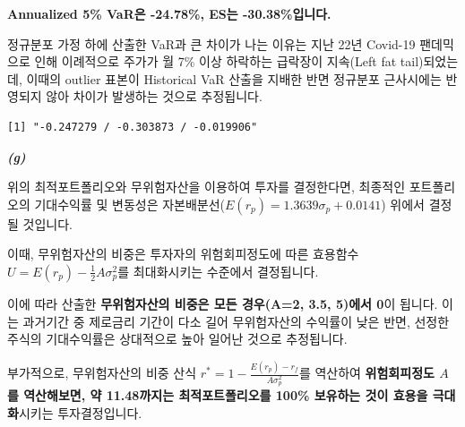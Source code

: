 \documentclass[
  letterpaper,
  DIV=11,
  numbers=noendperiod]{scrreprt}
\newenvironment{Shaded}{\begin{snugshade}}{\end{snugshade}}
\newcommand{\AttributeTok}[1]{\textcolor[rgb]{0.40,0.45,0.13}{#1}}
\newcommand{\DecValTok}[1]{\textcolor[rgb]{0.68,0.00,0.00}{#1}}
\newcommand{\FunctionTok}[1]{\textcolor[rgb]{0.28,0.35,0.67}{#1}}
\newcommand{\NormalTok}[1]{\textcolor[rgb]{0.00,0.23,0.31}{#1}}
\newcommand{\OtherTok}[1]{\textcolor[rgb]{0.00,0.23,0.31}{#1}}
\newcommand{\SpecialCharTok}[1]{\textcolor[rgb]{0.37,0.37,0.37}{#1}}
\newcommand{\StringTok}[1]{\textcolor[rgb]{0.13,0.47,0.30}{#1}}
\begin{document}
\textbf{Annualized 5\% VaR은 -24.78\%, ES는 -30.38\%입니다.}

정규분포 가정 하에 산출한 VaR과 큰 차이가 나는 이유는 지난 22년 Covid-19
팬데믹으로 인해 이례적으로 주가가 월 7\% 이상 하락하는 급락장이
지속(Left fat tail)되었는데, 이때의 outlier 표본이 Historical VaR 산출을
지배한 반면 정규분포 근사시에는 반영되지 않아 차이가 발생하는 것으로
추정됩니다.

\begin{Shaded}
\end{Shaded}

\begin{verbatim}
[1] "-0.247279 / -0.303873 / -0.019906"
\end{verbatim}

\textbf{\emph{(g)}}

위의 최적포트폴리오와 무위험자산을 이용하여 투자를 결정한다면, 최종적인
포트폴리오의 기대수익률 및 변동성은
자본배분선(\(E(r_p)=1.3639\sigma_p+0.0141\)) 위에서 결정될 것입니다.

이때, 무위험자산의 비중은 투자자의 위험회피정도에 따른 효용함수
\(U=E(r_p)-\frac{1}{2}A\sigma_p^2\)를 최대화시키는 수준에서 결정됩니다.

이에 따라 산출한 \textbf{무위험자산의 비중은 모든 경우(A=2, 3.5, 5)에서
0}이 됩니다. 이는 과거기간 중 제로금리 기간이 다소 길어 무위험자산의
수익률이 낮은 반면, 선정한 주식의 기대수익률은 상대적으로 높아 일어난
것으로 추정됩니다.

부가적으로, 무위험자산의 비중 산식
\(r^*=1-\frac{E(r_p)-r_f}{A\sigma_p^2}\)를 역산하여 \textbf{위험회피정도
\(A\)를 역산해보면, 약 11.48까지는 최적포트폴리오를 100\% 보유하는 것이
효용을 극대화}시키는 투자결정입니다.
\end{document}
